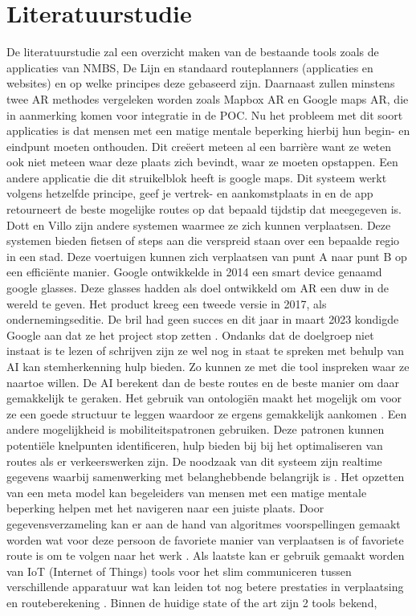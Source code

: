 \documentclass{hogent-article}
\begin{document}
    \section{Literatuurstudie}%
    \label{sec:literatuurstudie}
    
    De literatuurstudie zal een overzicht maken van de bestaande tools zoals de applicaties van NMBS, De Lijn en standaard routeplanners (applicaties en websites) en op welke principes deze gebaseerd zijn. Daarnaast zullen minstens twee AR methodes vergeleken worden zoals Mapbox AR en Google maps AR, die in aanmerking komen voor integratie in de POC. Nu het probleem met dit soort applicaties is dat mensen met een matige mentale beperking hierbij hun begin- en eindpunt moeten onthouden. Dit creëert meteen al een barrière want ze weten ook niet meteen waar deze plaats zich bevindt, waar ze moeten opstappen. Een andere applicatie die dit struikelblok heeft is google maps. Dit systeem werkt volgens hetzelfde principe, geef je vertrek- en aankomstplaats in en de app retourneert de beste mogelijke routes op dat bepaald tijdstip dat meegegeven is. Dott en Villo zijn andere systemen waarmee ze zich kunnen verplaatsen. Deze systemen bieden fietsen of steps aan die verspreid staan over een bepaalde regio in een stad. Deze voertuigen kunnen zich verplaatsen van punt A naar punt B op een efficiënte manier. Google ontwikkelde in 2014 een smart device genaamd google glasses. Deze glasses hadden als doel ontwikkeld om AR een duw in de wereld te geven. Het product kreeg een tweede versie in 2017, als ondernemingseditie. De bril had geen succes en dit jaar in maart 2023 kondigde Google aan dat ze het project stop zetten \autocite{Gvora2023}. Ondanks dat de doelgroep niet instaat is te lezen of schrijven zijn ze wel nog in staat te spreken met behulp van AI kan stemherkenning hulp bieden. Zo kunnen ze met die tool inspreken waar ze naartoe willen. De AI berekent dan de beste routes en de beste manier om daar gemakkelijk te geraken\autocite{Soni2023a}. Het gebruik van ontologiën maakt het mogelijk om voor ze een goede structuur te leggen waardoor ze ergens gemakkelijk aankomen \autocite{Ruta2010}. Een andere mogelijkheid is mobiliteitspatronen gebruiken. Deze patronen kunnen potentiële knelpunten identificeren, hulp bieden bij bij het optimaliseren van routes als er verkeerswerken zijn. De noodzaak van dit systeem zijn realtime gegevens waarbij samenwerking met belanghebbende belangrijk is \autocite{Ciravegna2018}. Het opzetten van een meta model kan begeleiders van mensen met een matige mentale beperking helpen met het navigeren naar een juiste plaats. Door gegevensverzameling kan er aan de hand van algoritmes voorspellingen gemaakt worden wat voor deze persoon de favoriete manier van verplaatsen is of favoriete route is om te volgen naar het werk \autocite{Stepanov2003}. Als laatste kan er gebruik gemaakt worden van IoT (Internet of Things) tools voor het slim communiceren tussen verschillende apparatuur wat kan leiden tot nog betere prestaties in verplaatsing en routeberekening \autocite{Fatnassi2015}. Binnen de huidige state of the art zijn 2 tools bekend, 
\end{document}
